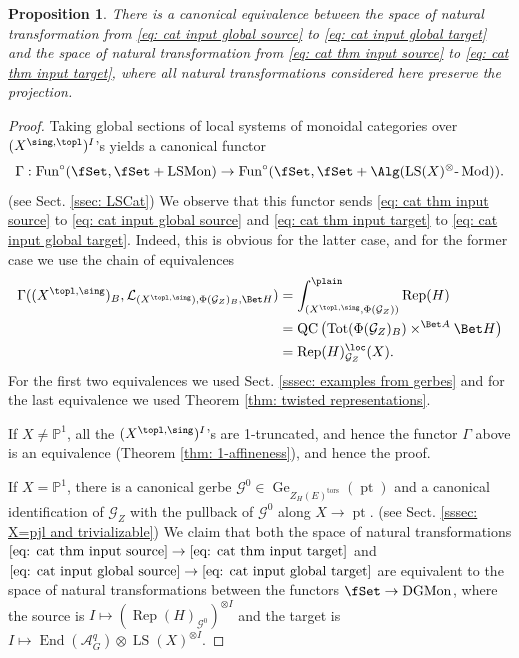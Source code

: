 \documentclass[10pt]{amsart}
\newtheorem{prop}[subsubsection]{Proposition}
\theoremstyle{remark}
\newcommand{\pjl}{\mathbb{P}^1}
\newcommand{\on}{\operatorname}
\newcommand{\cA}{\mathcal{A}}
\newcommand{\cG}{\mathcal{G}}
\newcommand{\cL}{\mathcal{L}}
\newcommand{\LSMon}{\on{LSMon}}
\newcommand{\DGCatMon}{\on{DGMon}}
\newcommand{\lMod}{\text{-}\on{Mod}}
\newcommand{\Rep}{\on{Rep}}
\newcommand{\QC}{\on{QC}}
\newcommand{\LS}{\on{LS}}
\DeclareMathOperator{\End}{End}
\newcommand{\Fun}{\on{Fun}}
\newcommand{\pt}{\on{pt}}
\newcommand{\Tot}{\on{Tot}}
\begin{document}
\begin{prop}\label{prop: equiv LS global}
   There is a canonical equivalence between the space of natural transformation from \eqref{eq: cat input global source} to \eqref{eq: cat input global target} and the space of natural transformation from \eqref{eq: cat thm input source} to \eqref{eq: cat thm input target}, where all natural transformations considered here preserve the projection.
\end{prop}
\begin{proof}
    Taking global sections of local systems of monoidal categories over $(X^{\sing,\topl})^I$'s yields a canonical functor
    \[\Gamma: \Fun^{\circ}(\fSet,\fSet+\LSMon)\rightarrow \Fun^{\circ}(\fSet,\fSet+\Alg(\LS(X)^{\otimes}\lMod)).\]
    (see Sect. \ref{ssec: LSCat}) We observe that this functor sends \eqref{eq: cat thm input source} to \eqref{eq: cat input global source} and \eqref{eq: cat thm input target} to \eqref{eq: cat input global target}. Indeed, this is obvious for the latter case, and for the former case we use the chain of equivalences
    \begin{align*}
    \Gamma((X^{\topl,\sing})_B, \cL_{(X^{\topl,\sing}),\Phi(\cG_Z)_B,\Bet H})&=\int^{\plain}_{(X^{\topl,\sing},\Phi(\cG_Z))}\Rep(H)\\
    &=\QC\left(\Tot(\Phi(\cG_Z)_B)\times^{\Bet A}\Bet H\right)\\
    &=\Rep(H)^{\loc}_{\cG_Z}(X).
    \end{align*}
    For the first two equivalences we used Sect. \ref{sssec: examples from gerbes} and for the last equivalence we used Theorem \ref{thm: twisted representations}.
    \medskip

    If $X\ne\pjl$, all the $(X^{\topl,\sing})^I$'s are 1-truncated, and hence the functor $\Gamma$ above is an equivalence (Theorem \ref{thm: 1-affineness}), and hence the proof.
    \medskip

    If $X=\pjl$, there is a canonical gerbe $\cG^0\in \on{Ge}_{Z_H(E)^{\on{tors}}}(\pt)$ and a canonical identification of $\cG_Z$ with the pullback of $\cG^0$ along $X\rightarrow\pt$. (see Sect. \ref{sssec: X=pjl and trivializable}) We claim that both the space of natural transformations $\eqref{eq: cat thm input source}\rightarrow \eqref{eq: cat thm input target}$ and $\eqref{eq: cat input global source}\rightarrow\eqref{eq: cat input global target}$ are equivalent to the space of natural transformations between the functors $\fSet\rightarrow\DGCatMon$, where the source is $I\mapsto (\Rep(H)_{\cG^0})^{\otimes I}$ and the target is $I\mapsto \End(\cA^q_G)\otimes\LS(X)^{\otimes I}$. 
\medskip
   

\end{proof}
\end{document}
